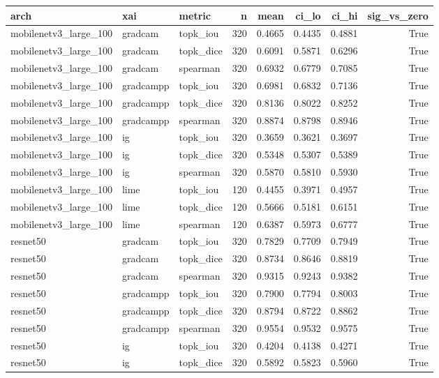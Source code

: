 \begin{tabular}{lllrrrrr}
\toprule
arch & xai & metric & n & mean & ci\_lo & ci\_hi & sig\_vs\_zero \\
\midrule
mobilenetv3\_large\_100 & gradcam & topk\_iou & 320 & 0.4665 & 0.4435 & 0.4881 & True \\
mobilenetv3\_large\_100 & gradcam & topk\_dice & 320 & 0.6091 & 0.5871 & 0.6296 & True \\
mobilenetv3\_large\_100 & gradcam & spearman & 320 & 0.6932 & 0.6779 & 0.7085 & True \\
mobilenetv3\_large\_100 & gradcampp & topk\_iou & 320 & 0.6981 & 0.6832 & 0.7136 & True \\
mobilenetv3\_large\_100 & gradcampp & topk\_dice & 320 & 0.8136 & 0.8022 & 0.8252 & True \\
mobilenetv3\_large\_100 & gradcampp & spearman & 320 & 0.8874 & 0.8798 & 0.8946 & True \\
mobilenetv3\_large\_100 & ig & topk\_iou & 320 & 0.3659 & 0.3621 & 0.3697 & True \\
mobilenetv3\_large\_100 & ig & topk\_dice & 320 & 0.5348 & 0.5307 & 0.5389 & True \\
mobilenetv3\_large\_100 & ig & spearman & 320 & 0.5870 & 0.5810 & 0.5930 & True \\
mobilenetv3\_large\_100 & lime & topk\_iou & 120 & 0.4455 & 0.3971 & 0.4957 & True \\
mobilenetv3\_large\_100 & lime & topk\_dice & 120 & 0.5666 & 0.5181 & 0.6151 & True \\
mobilenetv3\_large\_100 & lime & spearman & 120 & 0.6387 & 0.5973 & 0.6777 & True \\
resnet50 & gradcam & topk\_iou & 320 & 0.7829 & 0.7709 & 0.7949 & True \\
resnet50 & gradcam & topk\_dice & 320 & 0.8734 & 0.8646 & 0.8819 & True \\
resnet50 & gradcam & spearman & 320 & 0.9315 & 0.9243 & 0.9382 & True \\
resnet50 & gradcampp & topk\_iou & 320 & 0.7900 & 0.7794 & 0.8003 & True \\
resnet50 & gradcampp & topk\_dice & 320 & 0.8794 & 0.8722 & 0.8862 & True \\
resnet50 & gradcampp & spearman & 320 & 0.9554 & 0.9532 & 0.9575 & True \\
resnet50 & ig & topk\_iou & 320 & 0.4204 & 0.4138 & 0.4271 & True \\
resnet50 & ig & topk\_dice & 320 & 0.5892 & 0.5823 & 0.5960 & True \\

\end{tabular}
